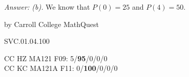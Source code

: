 {\it Answer: (b).} We know that $P(0) = 25$ and $P(4) = 50$.

\medskip
by Carroll College MathQuest

SVC.01.04.100


CC HZ MA121 F09: 5/{\bf95}/0/0/0  \\
CC KC MA121A F11: 0/{\bf100}/0/0/0  \\
